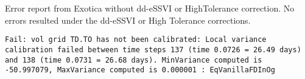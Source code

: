 \documentclass[11pt,letterpaper]{article}
\begin{document}
\newpage




\begin{center}
Error report from Exotica without dd-eSSVI or HighTolerance correction. No errors resulted under the dd-eSSVI or High Tolerance corrections.

\texttt{Fail:  vol grid TD.TO has not been calibrated: Local variance calibration failed between time steps 137 (time 0.0726 = 26.49 days) and 138 (time 0.0731 = 26.68 days). MinVariance computed is -50.997079, MaxVariance computed is 0.000001 : EqVanillaFDInOg}
\end{center}
\end{document}
